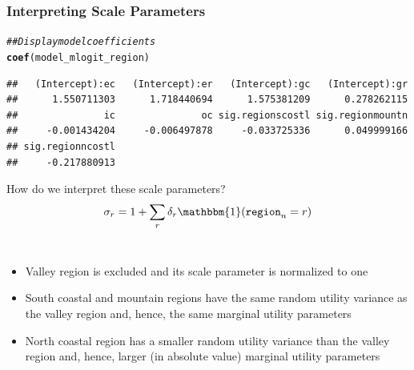 \documentclass{beamer}\usepackage[]{graphicx}\usepackage[]{xcolor}
\makeatletter
\newcommand{\hlcom}[1]{\textcolor[rgb]{0.678,0.584,0.686}{\textit{#1}}}%
\newcommand{\hlstd}[1]{\textcolor[rgb]{0.345,0.345,0.345}{#1}}%
\newcommand{\hlkwd}[1]{\textcolor[rgb]{0.737,0.353,0.396}{\textbf{#1}}}%
\newenvironment{kframe}{%
 \def\at@end@of@kframe{}%
 \ifinner\ifhmode%
  \def\at@end@of@kframe{\end{minipage}}%
  \begin{minipage}{\columnwidth}%
 \fi\fi%
 \def\FrameCommand##1{\hskip\@totalleftmargin \hskip-\fboxsep
 \colorbox{shadecolor}{##1}\hskip-\fboxsep
     \hskip-\linewidth \hskip-\@totalleftmargin \hskip\columnwidth}%
 \MakeFramed {\advance\hsize-\width
   \@totalleftmargin\z@ \linewidth\hsize
   \@setminipage}}%
 {\par\unskip\endMakeFramed%
 \at@end@of@kframe}
\newenvironment{knitrout}{}{} %
\makeatother
\begin{document}
\begin{frame}[fragile]\frametitle{Interpreting Scale Parameters}
\begin{knitrout}\footnotesize
{}\color{fgcolor}\begin{kframe}
\begin{alltt}
\hlcom{## Display model coefficients}
\hlkwd{coef}\hlstd{(model_mlogit_region)}
\end{alltt}
\begin{verbatim}
##   (Intercept):ec   (Intercept):er   (Intercept):gc   (Intercept):gr 
##      1.550711303      1.718440694      1.575381209      0.278262115 
##               ic               oc sig.regionscostl sig.regionmountn 
##     -0.001434204     -0.006497878     -0.033725336      0.049999166 
## sig.regionncostl 
##     -0.217880913
\end{verbatim}
\end{kframe}
\end{knitrout}
    \vspace{1ex}
    How do we interpret these scale parameters?
    $$\sigma_r = 1 + \sum_{r} \delta_r \mathbbm{1}(\mathtt{region}_n = r)$$ \\
    \begin{itemize}
    	\item Valley region is excluded and its scale parameter is normalized to one
        \item South coastal and mountain regions have the same random utility variance as the valley region and, hence, the same marginal utility parameters
        \item North coastal region has a smaller random utility variance than the valley region and, hence, larger (in absolute value) marginal utility parameters
    \end{itemize}
\end{frame}
\end{document}
